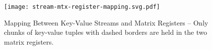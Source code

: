 \begin{figure}[tp]
  \centering
  \texttt{[image: stream-mtx-register-mapping.svg.pdf]}
  \caption{
    Mapping Between Key-Value Streams and Matrix Registers --
    Only chunks of key-value tuples with dashed borders are
    held in the two matrix registers.
  }
  \label{fig-spz-stream-mtx-reg-mapping}
  \vspace{-0.2cm}
\end{figure}
